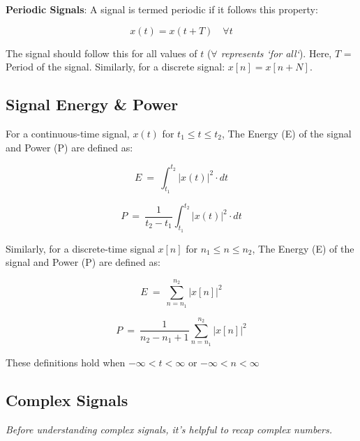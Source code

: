 \documentclass[letterpaper,12pt]{article}
\begin{document}
\textbf{Periodic Signals}: A signal is termed periodic if it follows this property:

\begin{equation}
    \label{eq:periodic_signal_condition}
    x(t) = x(t + T) \quad \forall t
\end{equation}

The signal should follow this for all values of $t$ (\textit{$\forall$ represents `for all`}). Here, $T$ = Period of the signal. Similarly, for a discrete signal: \(x[n] = x[n + N]\).

\subsection*{Signal Energy \& Power}
For a continuous-time signal, $x(t)$ for $t_1 \le t \le t_2$, The Energy (E) of the signal and Power (P) are defined as:

\begin{equation}
    \label{eq:cont_time_energy}
    E\ =\ \int_{t_{1}}^{t_{2}}\left|x\left(t\right)\right|^{2}\cdot dt
\end{equation}

\begin{equation}
    \label{eq:cont_time_power}
    P\ =\ \frac{1}{t_{2}-t_{1}}\int_{t_{1}}^{t_{2}}\left|x\left(t\right)\right|^{2}\cdot dt
\end{equation}

Similarly, for a discrete-time signal $x[n]$ for $n_1 \le n \le n_2$, The Energy (E) of the signal and Power (P) are defined as:

\begin{equation}
    \label{eq:disc_time_energy}
    E\ =\ \sum_{n=n_{1}}^{n_{2}}\left|x\left[n\right]\right|^{2}
\end{equation}

\begin{equation}
    \label{eq:disc_time_power}
    P\ =\ \frac{1}{n_{2}-n_{1}+1}\sum_{n=n_{1}}^{n_{2}}\left|x\left[n\right]\right|^{2}
\end{equation}

These definitions hold when $-\infty < t < \infty$ or $-\infty < n < \infty$

\subsection*{Complex Signals}
\textit{Before understanding complex signals, it's helpful to recap complex numbers.}
\end{document}
